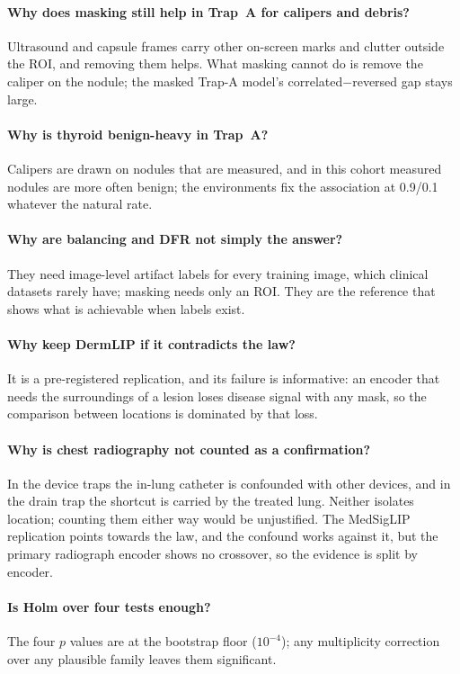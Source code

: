 \paragraph{Why does masking still help in Trap~A for calipers and debris?} Ultrasound and capsule frames carry other
on-screen marks and clutter outside the ROI, and removing them helps. What masking cannot do is remove the caliper on
the nodule; the masked Trap-A model's correlated$-$reversed gap stays large.
\paragraph{Why is thyroid benign-heavy in Trap~A?} Calipers are drawn on nodules that are measured, and in this cohort
measured nodules are more often benign; the environments fix the association at 0.9/0.1 whatever the natural rate.
\paragraph{Why are balancing and DFR not simply the answer?} They need image-level artifact labels for every training
image, which clinical datasets rarely have; masking needs only an ROI. They are the reference that shows what is
achievable when labels exist.
\paragraph{Why keep DermLIP if it contradicts the law?} It is a pre-registered replication, and its failure is
informative: an encoder that needs the surroundings of a lesion loses disease signal with any mask, so the comparison
between locations is dominated by that loss.
\paragraph{Why is chest radiography not counted as a confirmation?} In the device traps the in-lung catheter is
confounded with other devices, and in the drain trap the shortcut is carried by the treated lung. Neither isolates
location; counting them either way would be unjustified. The MedSigLIP replication points towards the law, and the
confound works against it, but the primary radiograph encoder shows no crossover, so the evidence is split by encoder.
\paragraph{Is Holm over four tests enough?} The four $p$ values are at the bootstrap floor ($10^{-4}$); any
multiplicity correction over any plausible family leaves them significant.
